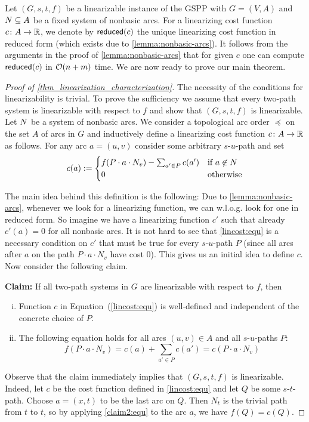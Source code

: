 Let $(G,s,t,f)$ be a linearizable  instance of the GSPP with $G=(V,A)$ and $N\subseteq A$ be a fixed system of nonbasic arcs. For a  linearizing cost function $c \colon A \rightarrow \mathbb{R}$, we denote by $\operatorname{\textsf{reduced}}(c)$ the unique linearizing cost function  in reduced form (which exists due to \cref{lemma:nonbasic-arcs}). 
It follows from the arguments in the proof of  \cref{lemma:nonbasic-arcs} that for given $c$ one can compute $\operatorname{\textsf{reduced}}(c)$ in $\mathcal{O}(n +m)$ time. We are now ready to prove our main theorem.
\begin{proof}[Proof of \cref{thm_linearization_characterization}]
The necessity of the conditions for linearizability is trivial.
To prove the sufficiency we  assume that every two-path system is linearizable with respect to $f$ and show that $(G,s,t,f)$ is linearizable. Let $N$ be a system of nonbasic arcs. 
    We consider a topological arc order $\preceq$ on the set  $A$ of arcs in $G$ and inductively define a linearizing cost function $c \colon A \rightarrow \mathbb{R}$ as follows. 
    For any arc $a = (u,v)$ consider some arbitrary $s$-$u$-path and set
        \begin{equation}\label{lincost:equ} c(a) := \begin{cases}
        f(P \cdot a \cdot N_v) - \sum_{a' \in P}c(a') 
        & \mbox{if } a \not\in \Nscript\\
        0%
         & \mbox{otherwise} %
        \end{cases}
        \end{equation}
   \smallskip

   The main idea behind this definition is the following: Due to \cref{lemma:nonbasic-arcs}, whenever we look for a linearizing function, we can w.l.o.g. look for one in reduced form. So imagine we have a linearizing function $c'$ such that already $c'(a) =  0$ for all nonbasic arcs. It is not hard to see that \cref{lincost:equ} is a necessary condition on $c'$ that must be true for every $s$-$u$-path $P$ (since all arcs after $a$ on the path $P \cdot a \cdot N_v$ have cost 0). This gives us an initial idea to define $c$. Now consider the following claim.
   \smallskip
   
   \textbf{Claim:} If all two-path systems in $G$ are linearizable with respect to $f$, then 
   \begin{enumerate}[(i)]
       \item Function $c$ in Equation~(\ref{lincost:equ}) is well-defined and independent of the concrete choice of $P$.
       \item The following equation holds for all arcs $(u,v) \in A$ and all $s$-$u$-paths $P$:
    \begin{equation}\label{claim2:equ} f(P \cdot a \cdot N_v)=c(a)+\sum_{a' \in P} c(a') = c(P \cdot a \cdot N_v)\end{equation}
   \end{enumerate}
     Observe that  the claim immediately implies  that $(G,s,t, f)$ is linearizable. Indeed, let $c$ be the  cost function defined in \cref{lincost:equ} and  let $Q$ be some $s$-$t$-path. Choose $a = (x,t)$ to be the  last arc on $Q$. Then $N_t$ is the trivial path from $t$ to $t$, so by  applying \cref{claim2:equ} to the arc $a$, we have $f(Q) = c(Q)$. 


\end{proof}
